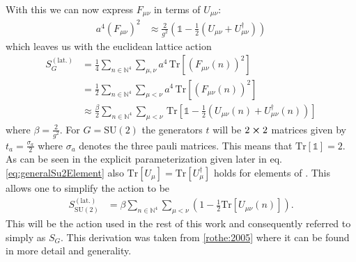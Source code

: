 With this we can now express $F_{\mu \nu}$ in terms of $U_{\mu \nu}$:
\begin{align*}
 a^4 (F_{\mu \nu})^2 & \approx \frac{2}{g^2} \left( \mathbb{1} - \frac{1}{2}\left( U_{\mu \nu} + U_{\mu \nu}^\dagger \right) \right)
\end{align*}
which leaves us with the euclidean lattice action
\begin{align*}
 S^{(\textrm{lat.})}_G & = \frac{1}{4} \sum_{n \in \mathbb{N}^4} \sum_{\mu,\nu} a^4 \, \mathrm{Tr} \left[ \left( F_{\mu \nu} (n) \right)^2  \right]                                                        \\
                       & = \frac{1}{2} \sum_{n \in \mathbb{N}^4} \sum_{\mu < \nu}  a^4 \, \mathrm{Tr} \left[ \left( F_{\mu \nu} (n) \right)^2  \right]                                                     \\
                       & \approx \frac{\beta}{2} \sum_{n \in \mathbb{N}^4} \sum_{\mu < \nu} \, \mathrm{Tr} \left[ \mathbb{1} - \frac{1}{2}\left( U_{\mu \nu} (n) + U_{\mu \nu}^\dagger (n) \right) \right]
\end{align*}
where $\beta = \frac{2}{g^2}$. For $G=\mathrm{SU}(2)$ the generators $t$ will be $2 \cross 2$ matrices given by $t_a = \frac{\sigma_a}{2}$ where $\sigma_a$ denotes the three pauli matrices. This means that $\mathrm{Tr}\left[ \mathbb{1} \right] = 2$. As can be seen in the explicit parameterization given later in eq.  \ref{eq:generalSu2Element} also $ \mathrm{Tr} \left[ U_\mu \right] = \mathrm{Tr} \left[ U_\mu^\dagger \right] $ holds for elements of \SUTwo. This allows one to simplify the action to be
\begin{align*}
 S^{(\textrm{lat.})}_{\mathrm{SU}(2)} & = \beta \sum_{n \in \mathbb{N}^4} \sum_{\mu < \nu} \left( 1 - \frac{1}{2} \mathrm{Tr} \left[ U_{\mu \nu} (n) \right] \right) \textrm{.}
\end{align*}
This will be the action used in the rest of this work and consequently referred to simply as $S_G$.
This derivation was taken from \ref{rothe:2005} where it can be found in more detail and generality.
